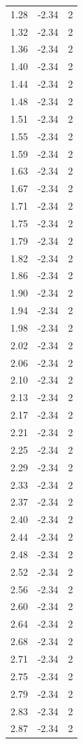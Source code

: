 \begin{longtable}{lrr}
  1.28 & -2.34 & 2 \\
  1.32 & -2.34 & 2 \\
  1.36 & -2.34 & 2 \\
  1.40 & -2.34 & 2 \\
  1.44 & -2.34 & 2 \\
  1.48 & -2.34 & 2 \\
  1.51 & -2.34 & 2 \\
  1.55 & -2.34 & 2 \\
  1.59 & -2.34 & 2 \\
  1.63 & -2.34 & 2 \\
  1.67 & -2.34 & 2 \\
  1.71 & -2.34 & 2 \\
  1.75 & -2.34 & 2 \\
  1.79 & -2.34 & 2 \\
  1.82 & -2.34 & 2 \\
  1.86 & -2.34 & 2 \\
  1.90 & -2.34 & 2 \\
  1.94 & -2.34 & 2 \\
  1.98 & -2.34 & 2 \\
  2.02 & -2.34 & 2 \\
  2.06 & -2.34 & 2 \\
  2.10 & -2.34 & 2 \\
  2.13 & -2.34 & 2 \\
  2.17 & -2.34 & 2 \\
  2.21 & -2.34 & 2 \\
  2.25 & -2.34 & 2 \\
  2.29 & -2.34 & 2 \\
  2.33 & -2.34 & 2 \\
  2.37 & -2.34 & 2 \\
  2.40 & -2.34 & 2 \\
  2.44 & -2.34 & 2 \\
  2.48 & -2.34 & 2 \\
  2.52 & -2.34 & 2 \\
  2.56 & -2.34 & 2 \\
  2.60 & -2.34 & 2 \\
  2.64 & -2.34 & 2 \\
  2.68 & -2.34 & 2 \\
  2.71 & -2.34 & 2 \\
  2.75 & -2.34 & 2 \\
  2.79 & -2.34 & 2 \\
  2.83 & -2.34 & 2 \\
  2.87 & -2.34 & 2 \\

\end{longtable}
